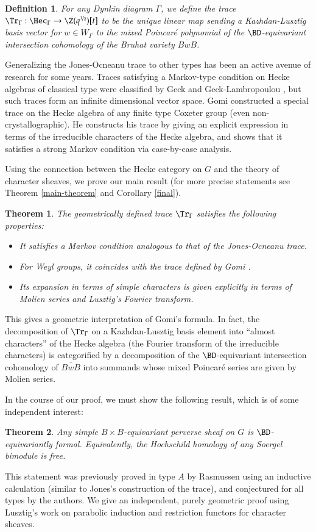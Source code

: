 \documentclass[12pt]{amsart}
\def\ov{\overline}
\def\to{\rightarrow}
\newtheorem{defi}[thm]{Definition}
\newtheorem*{theorem*}{Theorem}
\theoremstyle{remark}
\begin{document}
\begin{defi}
  For any Dynkin diagram $\Gamma$, we define the trace
  $\Tr_\Gamma:\Hec_\Gamma\to \Z(q^{\nicefrac 12})[t]$ to be the unique
  linear map sending a Kazhdan-Lusztig basis vector for $w\in
  W_\Gamma$ to the mixed Poincar\'e polynomial of the $\BD$-equivariant intersection cohomology of the Bruhat variety $\ov{BwB}$.
\end{defi}
Generalizing the
Jones-Ocneanu trace to other types has been an active avenue of
research for some years.  Traces satisfying a Markov-type condition on
Hecke algebras of classical type were classified by Geck and
Geck-Lambropoulou \cite{Geck,GL}, but such traces form an infinite
dimensional vector space.  Gomi \cite{Gomi} constructed a special
trace on the Hecke algebra of any finite type Coxeter group (even non-crystallographic). He constructs his trace by giving an explicit expression in terms of the irreducible characters of the Hecke algebra, and shows that it satisfies a strong Markov condition via case-by-case analysis.

Using the connection between the Hecke category on $G$ and the theory
of character sheaves, we prove our main result (for more precise statements
see Theorem \ref{main-theorem} and Corollary \ref{final}).  

\begin{theorem*}
  The geometrically defined trace $\Tr_\Gamma$ satisfies the following properties:
  \begin{itemize}
  \item It satisfies a Markov condition analogous to that of the Jones-Ocneanu
    trace.
  \item For Weyl groups, it coincides with the trace defined by Gomi \cite{Gomi}.
  \item Its expansion in terms of simple
    characters is given explicitly in terms of Molien series and
    Lusztig's Fourier transform.
  \end{itemize} 
\end{theorem*}


This gives a geometric interpretation of Gomi's
formula.
In fact, the decomposition of $\Tr_\Gamma$ on a Kazhdan-Lusztig basis element into ``almost characters'' of the Hecke algebra (the Fourier transform of the irreducible characters) is categorified by a decomposition of the $\BD$-equivariant intersection cohomology of $\ov{BwB}$ into summands whose mixed Poincar\'e series are given by Molien series. 
\medskip

In the course of our proof, we must show the following result, which is of some independent interest:
\begin{theorem*}
  Any simple $B\! \times \!B$-equivariant perverse sheaf on $G$ is
  $\BD$-equivariantly formal. Equivalently, the Hochschild homology of
  any Soergel bimodule is free.
\end{theorem*}
 This statement was previously proved in type $A$ by Rasmussen
\cite[Proposition 4.6]{Ras06} using an inductive calculation (similar to Jones's
construction of the trace), and conjectured for all types by the authors.
We give an independent, purely geometric proof using Lusztig's work on parabolic induction and restriction functors for character sheaves.\medskip
\end{document}
